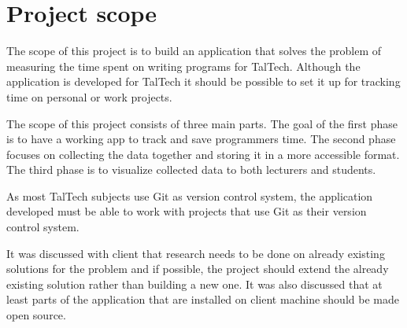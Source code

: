 \section{Project scope}\label{sec:project-scope}
The scope of this project is to build an application that solves the problem of measuring the time spent on writing programs for TalTech.
Although the application is developed for TalTech it should be possible to set it up for tracking time on personal or work projects.

The scope of this project consists of three main parts.
The goal of the first phase is to have a working app to track and save programmers time.
The second phase focuses on collecting the data together and storing it in a more accessible format.
The third phase is to visualize collected data to both lecturers and students.

As most TalTech subjects use Git as version control system, the application developed must be able to work with
projects that use Git as their version control system.

It was discussed with client that research needs to be done on already existing solutions for the problem and if possible,
the project should extend the already existing solution rather than building a new one.
It was also discussed that at least parts of the application that are installed on client machine should be made open source.

